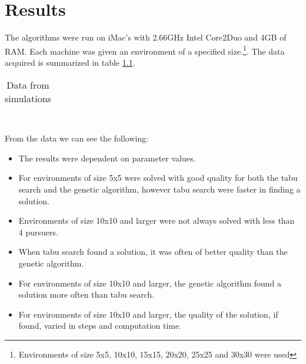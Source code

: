 \chapter{Results}
The algorithms were run on iMac's with 2.66GHz Intel Core2Duo and 4GB of RAM. Each machine was given an environment of a specified size.\footnote{Environments of size 5x5, 10x10, 15x15, 20x20, 25x25 and 30x30 were used}. The data acquired is summarized in table \ref{SimData}.
\begin{table}[t!hb]
\begin{tabular}{| c | r | r | r | r | r | r | }
\hline
 
\hline
\end{tabular}
\label{SimData}
\caption{Data from simulations}
\end{table}
\\ From the data we can see the following:
\begin{itemize}
\item{The results were dependent on parameter values.}
\item{For environments of size 5x5 were solved with good quality for both the tabu search and the genetic algorithm, however tabu search were faster in finding a solution.}
\item{Environments of size 10x10 and larger were not always solved with less than 4 pursuers.}
\item{When tabu search found a solution, it was often of better quality than the genetic algorithm.}
\item{For environments of size 10x10 and larger, the genetic algorithm found a solution more often than tabu search.}
\item{For environments of size 10x10 and larger, the quality of the solution, if found, varied in steps and computation time.}
\end{itemize}


